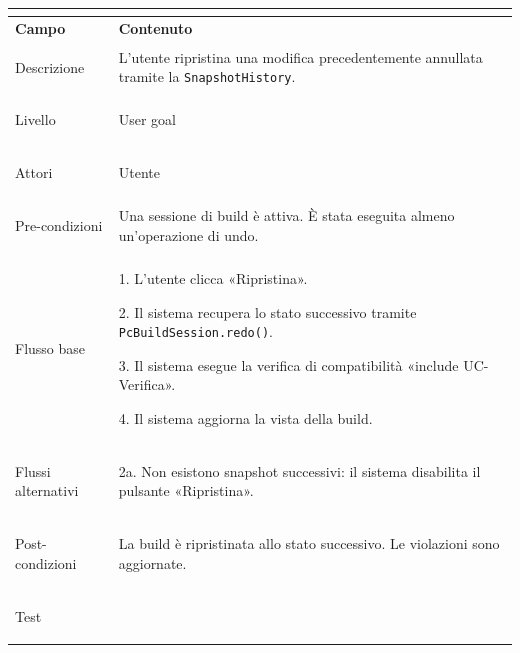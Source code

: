 \documentclass[11pt, a4paper]{article}
\begin{document}
\vspace{10pt}




\noindent

\begin{tabularx}{\textwidth}{|>{\bfseries}p{3.8cm}|X|}

\hline

\multicolumn{2}{|l|}{\textbf{UC5 --- Ripristina modifica (redo)}} \\

\hline

Campo & \textbf{Contenuto} \\

\hline

Descrizione & L'utente ripristina una modifica precedentemente annullata tramite la \texttt{SnapshotHistory}. \\

\hline

Livello & User goal \\

\hline

Attori & Utente \\

\hline

Pre-condizioni & Una sessione di build è attiva. È stata eseguita almeno un'operazione di undo. \\

\hline

Flusso base & 

1. L'utente clicca «Ripristina».\newline

2. Il sistema recupera lo stato successivo tramite \texttt{PcBuildSession.redo()}.\newline

3. Il sistema esegue la verifica di compatibilità «include UC-Verifica».\newline

4. Il sistema aggiorna la vista della build. \\

\hline

Flussi alternativi & 2a. Non esistono snapshot successivi: il sistema disabilita il pulsante «Ripristina». \\

\hline

Post-condizioni & La build è ripristinata allo stato successivo. Le violazioni sono aggiornate. \\

\hline

Test & \\

\hline

\end{tabularx}
\end{document}
